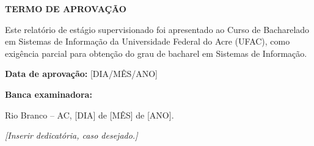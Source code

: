 
\begin{folhadeaprovacao}
  \begin{center}
    {\ABNTEXchapterfont\bfseries\large TERMO DE APROVAÇÃO\par}
    \vspace*{1.2cm}

    {\large\MakeUppercase{\imprimirautor}\par}
    \vspace*{1.2cm}

    {\ABNTEXchapterfont\bfseries\large\MakeUppercase{\imprimirtitulo}\par}
  \end{center}

  \vspace{1.3cm}
  Este relatório de estágio supervisionado foi apresentado ao Curso de
  Bacharelado em Sistemas de Informação da Universidade Federal do Acre
  (UFAC), como exigência parcial para obtenção do grau de bacharel
  em Sistemas de Informação.

  \vspace{0.6cm}
  \noindent\textbf{Data de aprovação:} [DIA/MÊS/ANO]

  \vspace{0.5cm}
  \noindent\textbf{Banca examinadora:}



  \begin{center}
    \vfill
    Rio Branco -- AC, [DIA] de [MÊS] de [ANO].
  \end{center}
\end{folhadeaprovacao}
\cleardoublepage

\begin{dedicatoria}
  \vspace*{\fill}
  \begin{flushright}
    \begin{minipage}{0.65\textwidth}
      \raggedleft
      \textit{[Inserir dedicatória, caso desejado.]}
    \end{minipage}
  \end{flushright}
  \vspace*{\fill}
\end{dedicatoria}
\cleardoublepage

